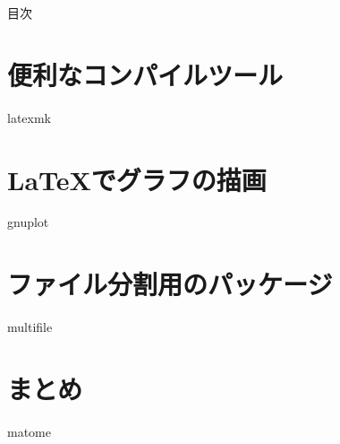 \documentclass[12pt, dvipdfmx]{beamer}
\begin{document}
\maketitle
\begin{frame}{目次}
	\tableofcontents
\end{frame}

\section{便利なコンパイルツール}
{latexmk}
\section{\LaTeX でグラフの描画}
{gnuplot}
\section{ファイル分割用のパッケージ}
{multifile}
\section{まとめ}
{matome}
\end{document}
